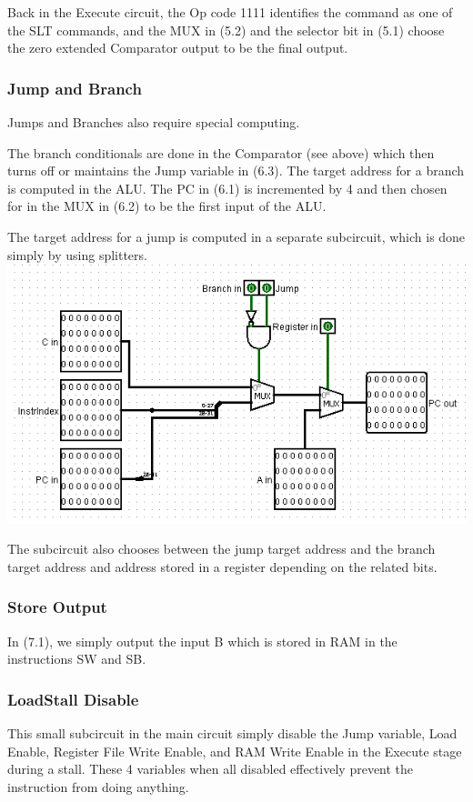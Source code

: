 \documentclass{article}
\begin{document}
Back in the Execute circuit, the Op code 1111 identifies the command as one of the SLT commands, and the MUX in (5.2) and the selector bit in (5.1) choose the zero extended Comparator output to be the final output. 

\subsubsection{Jump and Branch}
Jumps and Branches also require special computing. 

The branch conditionals are done in the Comparator (see above) which then turns off or maintains the Jump variable in (6.3). The target address for a branch is computed in the ALU. The PC in (6.1) is incremented by 4 and then chosen for in the MUX in (6.2) to be the first input of the ALU. 

The target address for a jump is computed in a separate subcircuit, which is done simply by using splitters. 
\includegraphics{Jump.png}

The subcircuit also chooses between the jump target address and the branch target address and address stored in a register depending on the related bits. 

\subsubsection{Store Output}
In (7.1), we simply output the input B which is stored in RAM in the instructions SW and SB.

\subsubsection{LoadStall Disable}
This small subcircuit in the main circuit simply disable the Jump variable, Load Enable, Register File Write Enable, and RAM Write Enable in the Execute stage during a stall. These 4 variables when all disabled effectively prevent the instruction from doing anything.
\end{document}
